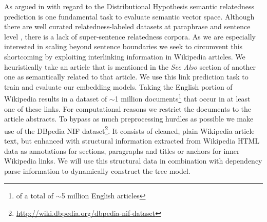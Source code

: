 As argued in \textcite{binder_comparison_2018} with regard to the Distributional Hypothesis \autocite{harris_distributional_1954} semantic relatedness \autocite{resnik_semantic_1999, budanitsky_evaluating_2006} prediction is one fundamental task to evaluate semantic vector space. Although there are well curated relatedness-labeled datasets at paraphrase and sentence level \autocite{pavlick_ppdb_2015, dolan_automatically_2005, marelli_sick_2014,cer_semeval-2017_2017}, there is a lack of super-sentence relatedness corpora. As we are especially interested in scaling beyond sentence boundaries we seek to circumvent this shortcoming by exploiting interlinking information in Wikipedia articles. We heuristically take an article that is mentioned in the \textit{See Also} section of another one as semantically related to that article. We use this link prediction task to train and evaluate our embedding models. Taking the English portion of Wikipedia results in a dataset of $\sim$1 million documents\footnote{of a total of $\sim$5 million English articles} that occur in at least one of these links. For computational reasons we restrict the documents to the article abstracts. To bypass as much preprocessing hurdles as possible we make use of the DBpedia NIF \autocite{dojchinovski_dbpedia_2018} dataset\footnote{\url{http://wiki.dbpedia.org/dbpedia-nif-dataset}}. It consists of cleaned, plain Wikipedia article text, but enhanced with structural information extracted from Wikipedia HTML data as annotations for sections, paragraphs and titles or anchors for inner Wikipedia links. We will use this structural data in combination with dependency parse information to dynamically construct the tree model.







 



